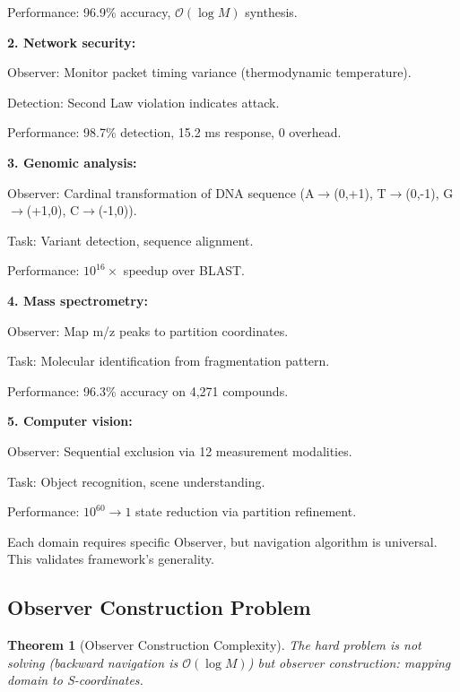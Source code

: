 \documentclass[twocolumn,10pt]{article}
\newtheorem{theorem}{Theorem}[section]
\theoremstyle{definition}
\theoremstyle{remark}
\newcommand{\bigO}{\mathcal{O}}
\begin{document}
Performance: 96.9\% accuracy, $\bigO(\log M)$ synthesis.

\vspace{0.2cm}
\noindent\textbf{2. Network security:}

Observer: Monitor packet timing variance (thermodynamic temperature).

Detection: Second Law violation indicates attack.

Performance: 98.7\% detection, 15.2 ms response, 0 overhead.

\vspace{0.2cm}
\noindent\textbf{3. Genomic analysis:}

Observer: Cardinal transformation of DNA sequence (A$\to$(0,+1), T$\to$(0,-1), G$\to$(+1,0), C$\to$(-1,0)).

Task: Variant detection, sequence alignment.

Performance: $10^{16}\times$ speedup over BLAST.

\vspace{0.2cm}
\noindent\textbf{4. Mass spectrometry:}

Observer: Map m/z peaks to partition coordinates.

Task: Molecular identification from fragmentation pattern.

Performance: 96.3\% accuracy on 4,271 compounds.

\vspace{0.2cm}
\noindent\textbf{5. Computer vision:}

Observer: Sequential exclusion via 12 measurement modalities.

Task: Object recognition, scene understanding.

Performance: $10^{60} \to 1$ state reduction via partition refinement.

\vspace{0.2cm}
\noindent Each domain requires specific Observer, but navigation algorithm is universal. This validates framework's generality.

\subsection{Observer Construction Problem}

\begin{theorem}[Observer Construction Complexity]
\label{thm:observer_construction}
The hard problem is not solving (backward navigation is $\bigO(\log M)$) but observer construction: mapping domain to S-coordinates.
\end{theorem}
\end{document}
